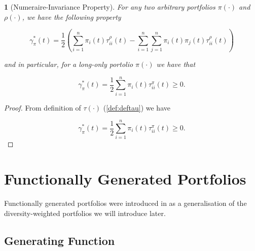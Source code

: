 \documentclass[british]{amsart} \usepackage{lmodern}
\numberwithin{equation}{section} \numberwithin{figure}{section}
\theoremstyle{plain} \newtheorem{thm}{\protect\theoremname}[section]
\theoremstyle{definition} \newtheorem{defn}[thm]{\protect\definitionname}
\theoremstyle{plain} \newtheorem{assumption}[thm]{\protect\assumptionname}
\theoremstyle{plain} \newtheorem{lem}[thm]{\protect\lemmaname}
\theoremstyle{plain} \newtheorem{prop}[thm]{\protect\propositionname}
\theoremstyle{remark} \newtheorem{rem}[thm]{\protect\remarkname}
\theoremstyle{plain} \newtheorem{cor}[thm]{\protect\corollaryname}
\begin{document}
\begin{lem} [Numeraire-Invariance Property]
 For any two arbitrary portfolios $\pi(\cdot)$ and $\rho(\cdot)$, we have the
following property 

  \begin{equation} 
    \label{eq:numeraireinvarianceproperty}
    \gamma_{\pi}^{*}(t) = \frac{1}{2} 
        \left(
          \sum_{i=1}^{n} \pi_{i}(t)\tau_{ii}^{\rho}(t) - 
          \sum_{i=1}^{n} \sum_{j=1}^{n} \pi_{i}(t)\pi_{j}(t)\tau_{ii}^{\rho}(t) 
        \right)
  \end{equation}

  and in particular, for a long-only portolio $\pi(\cdot)$ we have that

  \begin{equation} 
    \label{eq:numeraireinvarianceproperty}
    \gamma_{\pi}^{*}(t) = \frac{1}{2} 
          \sum_{i=1}^{n} \pi_{i}(t)\tau_{ii}^{\pi}(t) 
     \ge 0. 
  \end{equation}
 
\end{lem}

\begin{proof}

  From definition of $\tau(\cdot)$ (\ref{def:deftau}) we have

  \begin{equation} 
    \gamma_{\pi}^{*}(t) = \frac{1}{2} 
          \sum_{i=1}^{n} \pi_{i}(t)\tau_{ii}^{\pi}(t) 
     \ge 0. 
  \end{equation}

\end{proof}

\newpage
\section{Functionally Generated Portfolios}

Functionally generated portfolios were introduced in \cite{fernholz1999pgf} as a
generalisation of the diversity-weighted portfolios we will introduce later.

\subsection{Generating Function}

\end{document}

